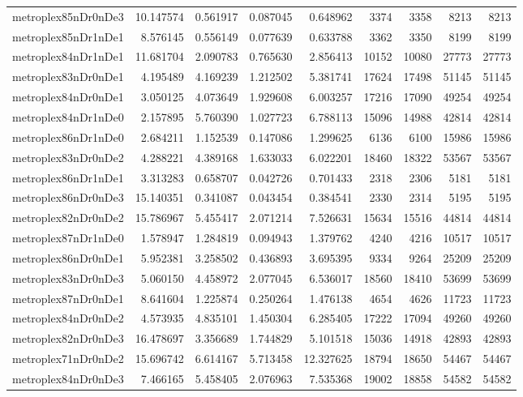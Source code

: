 \begin{longtable}{|l|r|r|r|r|r|r|r|r|}
metroplex85nDr0nDe3 & 10.147574 & 0.561917 & 0.087045 & 0.648962 & 3374 & 3358 & 8213 & 8213 \\
metroplex85nDr1nDe1 & 8.576145 & 0.556149 & 0.077639 & 0.633788 & 3362 & 3350 & 8199 & 8199 \\
metroplex84nDr1nDe1 & 11.681704 & 2.090783 & 0.765630 & 2.856413 & 10152 & 10080 & 27773 & 27773 \\
metroplex83nDr0nDe1 & 4.195489 & 4.169239 & 1.212502 & 5.381741 & 17624 & 17498 & 51145 & 51145 \\
metroplex84nDr0nDe1 & 3.050125 & 4.073649 & 1.929608 & 6.003257 & 17216 & 17090 & 49254 & 49254 \\
metroplex84nDr1nDe0 & 2.157895 & 5.760390 & 1.027723 & 6.788113 & 15096 & 14988 & 42814 & 42814 \\
metroplex86nDr1nDe0 & 2.684211 & 1.152539 & 0.147086 & 1.299625 & 6136 & 6100 & 15986 & 15986 \\
metroplex83nDr0nDe2 & 4.288221 & 4.389168 & 1.633033 & 6.022201 & 18460 & 18322 & 53567 & 53567 \\
metroplex86nDr1nDe1 & 3.313283 & 0.658707 & 0.042726 & 0.701433 & 2318 & 2306 & 5181 & 5181 \\
metroplex86nDr0nDe3 & 15.140351 & 0.341087 & 0.043454 & 0.384541 & 2330 & 2314 & 5195 & 5195 \\
metroplex82nDr0nDe2 & 15.786967 & 5.455417 & 2.071214 & 7.526631 & 15634 & 15516 & 44814 & 44814 \\
metroplex87nDr1nDe0 & 1.578947 & 1.284819 & 0.094943 & 1.379762 & 4240 & 4216 & 10517 & 10517 \\
metroplex86nDr0nDe1 & 5.952381 & 3.258502 & 0.436893 & 3.695395 & 9334 & 9264 & 25209 & 25209 \\
metroplex83nDr0nDe3 & 5.060150 & 4.458972 & 2.077045 & 6.536017 & 18560 & 18410 & 53699 & 53699 \\
metroplex87nDr0nDe1 & 8.641604 & 1.225874 & 0.250264 & 1.476138 & 4654 & 4626 & 11723 & 11723 \\
metroplex84nDr0nDe2 & 4.573935 & 4.835101 & 1.450304 & 6.285405 & 17222 & 17094 & 49260 & 49260 \\
metroplex82nDr0nDe3 & 16.478697 & 3.356689 & 1.744829 & 5.101518 & 15036 & 14918 & 42893 & 42893 \\
metroplex71nDr0nDe2 & 15.696742 & 6.614167 & 5.713458 & 12.327625 & 18794 & 18650 & 54467 & 54467 \\
metroplex84nDr0nDe3 & 7.466165 & 5.458405 & 2.076963 & 7.535368 & 19002 & 18858 & 54582 & 54582 \\

\end{longtable}

